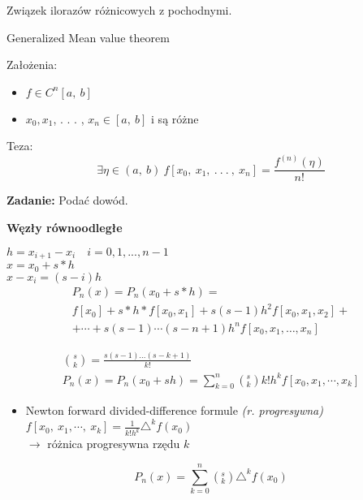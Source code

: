 \begin{frame}
Związek ilorazów różnicowych z pochodnymi.
\begin{block}
{Generalized Mean value theorem}

Założenia:
\begin{itemize}
\item $f\in C^{n}[a,\ b]$
\item $x_{0}, x_{1}$, . . . , $x_{n}\in[a,\ b] $ i są różne
\end{itemize}

Teza:
$$
\exists\eta\in(a,\ b)\ f[x_{0},\ x_{1},\ .\ .\ .\ ,\ x_{n}]=\frac{f^{(n)}(\eta)}{n!}
$$
\end{block}
\vspace{5mm}

\textbf{Zadanie:} Podać dowód.
\end{frame}

\begin{frame}
\textbf{Węzły równoodległe}

$h=x_{i+1}-x_{i} \quad i=0, 1, ..., n-1$ \\
$x=x_{0}+s*h$ \\
$x-x_{i}=(s-i)h$ \\

\begin{gather*} P_{n}(x)=P_{n}(x_{0}+s*h) =\\
   f[x_{0}]+s*h*f[x_{0}, x_{1}]+s(s - 1)h^{2}f[x_{0},x_{1},x_{2}]+ \\
+ \cdots +s(s-1)\cdots(s-n+1)h^{n}f[x_{0},x_{1},\dots ,x_{n}]
\end{gather*}

\begin{gather*}
\binom{s}{k}=\displaystyle \frac{s(s-1)\ldots(s-k+1)}{k!}\\
P_{n}(x)=P_{n}(x_{0}+sh)=\sum_{k=0}^{n}(_{k}^{s})k!h^{k}f[x_{0}, x_{1}, \cdots ,x_{k}]
\end{gather*}
\end{frame}

\begin{frame}
\begin{itemize}
\item Newton forward divided-difference formule {\it (r. progresywna)} \\
\vspace{2mm}
$f[x_{0},\displaystyle \ x_{1},\cdots,\ x_{k}]=\frac{1}{k!h^{k}}\triangle^{k}f(x_{0})$ \\
\vspace{3mm}
$\rightarrow$ różnica progresywna rzędu $k$
\end{itemize}

$$P_{n}(x)=\displaystyle \sum_{k=0}^{n}(_{k}^{s})\triangle^{k}f(x_{0})$$
\end{frame}
